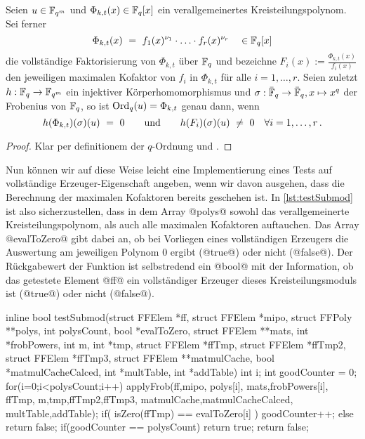 \begin{lemma}
  Seien $u\in \mathbb{F}_{q^m}$ und $\Phi_{k,t}(x) \in \mathbb{F}_q[x]$ ein verallgemeinertes
  Kreisteilungspolynom. Sei ferner
  \[ \Phi_{k,t}(x)  \ =\  f_1(x)^{\nu_1} \cdot \ldots \cdot
    f_r(x)^{\nu_r}\quad \in \mathbb{F}_q[x]\]
  die vollständige Faktorisierung von $\Phi_{k,t}$ über $\mathbb{F}_q$ und
  bezeichne $F_i(x) := \tfrac{\Phi_{k,t}(x)}{f_i(x)}$ den jeweiligen maximalen
  Kofaktor von $f_i$ in $\Phi_{k,t}$ für alle $i=1,\ldots,r$.
  Seien zuletzt $h: \mathbb{F}_q \to \mathbb{F}_{q^m}$ ein injektiver Körperhomomorphismus und 
  $\sigma:\bar {\mathbb{F}}_q \to \bar {\mathbb{F}}_q, x\mapsto x^q$ der Frobenius von $\mathbb{F}_q$, 
  so ist $\operatorname{Ord}_q(u) = \Phi_{k,t}$ genau dann, wenn
  \[h(\Phi_{k,t})(\sigma)(u) \ =\  0 
    \qquad\text{und}\qquad 
    h(F_i)(\sigma)(u) \ \neq\  0 \quad \forall i=1,\ldots,r \,.\]
\end{lemma}
\begin{proof}
  Klar per definitionem der $q$-Ordnung und .
\end{proof}


Nun können wir auf diese Weise leicht eine Implementierung eines Tests auf
vollständige Erzeuger-Eigenschaft angeben, wenn wir davon ausgehen, dass die
Berechnung der maximalen Kofaktoren bereits geschehen ist. In
\autoref{lst:testSubmod} ist also sicherzustellen, dass in dem Array
@polys@ sowohl das verallgemeinerte Kreisteilungspolynom, als auch alle 
maximalen Kofaktoren auftauchen. Das Array @evalToZero@ gibt dabei an, ob 
bei Vorliegen eines vollständigen Erzeugers die Auswertung am jeweiligen
Polynom $0$ ergibt (@true@) oder nicht (@false@). Der Rückgabewert der Funktion
ist selbstredend ein @bool@ mit der Information, ob das getestete Element @ff@
ein vollständiger Erzeuger dieses Kreisteilungsmoduls ist (@true@) oder nicht
(@false@).

\begin{ccode}[caption={Aus \url{../Sage/enumeratePCNs.c}},
  firstnumber=912, label=lst:testSubmod]
inline bool testSubmod(struct FFElem *ff, struct FFElem *mipo, 
        struct FFPoly **polys,
        int polysCount, bool *evalToZero, 
        struct FFElem **mats, int *frobPowers,
        int m, int *tmp, 
        struct FFElem *ffTmp, struct FFElem *ffTmp2, struct FFElem *ffTmp3, 
        struct FFElem **matmulCache, bool *matmulCacheCalced,
        int *multTable, int *addTable){
    int i;
    int goodCounter = 0;
    for(i=0;i<polysCount;i++){
        applyFrob(ff,mipo,
                polys[i],
                mats,frobPowers[i], ffTmp,
                m,tmp,ffTmp2,ffTmp3,
                matmulCache,matmulCacheCalced,
                multTable,addTable);
        if( isZero(ffTmp) == evalToZero[i] ){
            goodCounter++;
        }else{
            return false;
        }
    }
    if(goodCounter == polysCount){
        return true;
    }
    return false;
}
\end{ccode}


